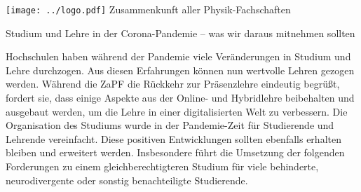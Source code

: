 \documentclass[DIV=calc]{scrartcl}
\begin{document}
\hspace{0.87\textwidth}
\begin{minipage}{120pt}
\vspace{-1.8cm}
\texttt{[image: ../logo.pdf]}
\centering
\small Zusammenkunft aller Physik-Fachschaften
\end{minipage}

\begin{center}
  \huge{Studium und Lehre in der Corona-Pandemie -- was wir daraus mitnehmen sollten}\vspace{.25\baselineskip}\\
  \normalsize
\end{center}
\vspace{1cm}







Hochschulen haben während der Pandemie viele Veränderungen in Studium und Lehre durchzogen. Aus diesen Erfahrungen können nun wertvolle Lehren gezogen werden. Während die ZaPF die Rückkehr zur Präsenzlehre eindeutig begrüßt, fordert sie, dass einige Aspekte aus der Online- und Hybridlehre beibehalten und ausgebaut werden, um die Lehre in einer digitalisierten Welt zu verbessern. Die Organisation des Studiums wurde in der Pandemie-Zeit für Studierende und Lehrende vereinfacht. Diese positiven Entwicklungen sollten ebenfalls erhalten bleiben und erweitert werden. Insbesondere führt die Umsetzung der folgenden Forderungen zu einem gleichberechtigteren Studium für viele behinderte, neurodivergente oder sonstig benachteiligte Studierende.
\end{document}
